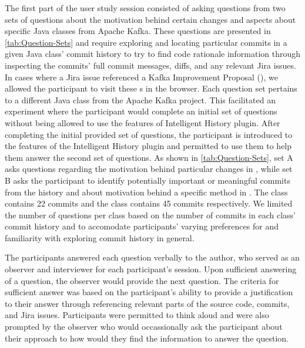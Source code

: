 The first part of the user study session consisted of asking questions from two sets of questions about the motivation behind certain changes and aspects about specific Java classes from Apache Kafka.
These questions are presented in \autoref{tab:Question-Sets} and require exploring and locating particular commits in a given Java class' commit history to try to find code rationale information through inspecting the commits' full commit messages,
diffs, and any relevant Jira issues.
In cases where a Jira issue referenced a Kafka Improvement Proposal (), we allowed the participant to visit these s in the browser.
Each question set pertains to a different Java class from the Apache Kafka project.
This facilitated an experiment where the participant would complete an initial set of questions without being allowed to use the features of Intelligent History plugin.
After completing the initial provided set of questions, the participant is introduced to the features of the Intelligent History plugin and permitted to use them to help them answer the second set of questions.
As shown in \autoref{tab:Question-Sets}, set A asks questions regarding the motivation behind particular changes in , while set B asks the participant to identify potentially important or meaningful commits from the history and about motivation behind a specific method in .
The  class contains 22 commits and the  class contains 45 commits respectively.
We limited the number of questions per class based on the number of commits in each class' commit history and to accomodate participants' varying preferences for and familiarity with exploring commit history in general.

The participants answered each question verbally to the author, who served as an observer and interviewer for each participant's session.
Upon sufficient answering of a question, the observer would provide the next question.
The criteria for sufficient answer was based on the participant's ability to provide a justification to their answer through referencing relevant parts of the source code, commits, and Jira issues.
Participants were permitted to think aloud and were also prompted by the observer who would occassionally ask the participant about their approach to how would they find the information to answer the question.

